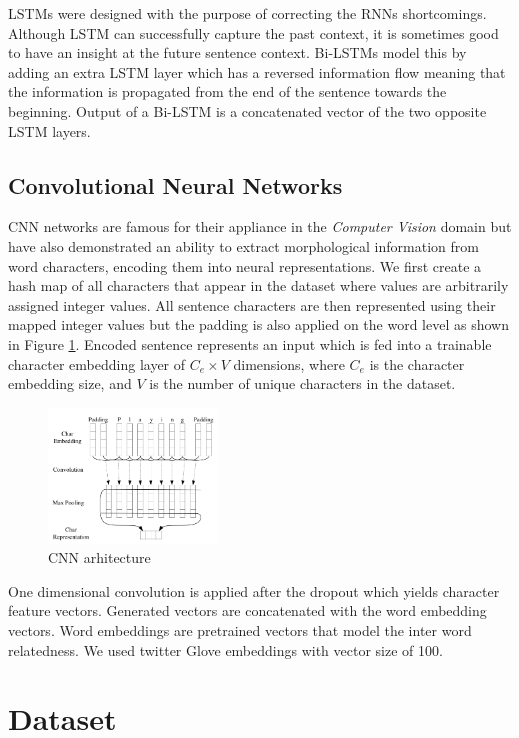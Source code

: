 \documentclass[10pt, a4paper]{article}
\begin{document}
LSTMs were designed with the purpose of correcting the RNNs shortcomings. Although LSTM can successfully capture the past context, it is sometimes good to have an insight at the future sentence context. Bi-LSTMs model this by adding an extra LSTM layer which has a reversed information flow meaning that the information is propagated from the end of the sentence towards the beginning. Output of a Bi-LSTM is a concatenated vector of the two opposite LSTM layers.

\subsection{Convolutional Neural Networks}

CNN networks are famous for their appliance in the \emph{Computer Vision} domain but have also demonstrated an ability to extract morphological information from word characters, encoding them into neural representations. We first create a hash map of all characters that appear in the dataset where values are arbitrarily assigned integer values. All sentence characters are then represented using their mapped integer values but the padding is also applied on the word level as shown in Figure \ref{fig:cnn_embed}. Encoded sentence represents an input which is fed into a trainable character embedding layer of $C_e \times V$ dimensions, where $C_e$ is the character embedding size, and $V$ is the number of unique characters in the dataset.

\begin{figure}
  \caption{CNN arhitecture}
  \label{fig:cnn_embed}
  \centering
    \includegraphics[width=0.4\textwidth]{imgs/cnn_embed.png}
\end{figure}

One dimensional convolution is applied after the dropout which yields character feature vectors. Generated vectors are concatenated with the word embedding vectors. Word embeddings are pretrained vectors that model the inter word relatedness. We used twitter Glove embeddings with vector size of 100.

\section{Dataset}
\end{document}
